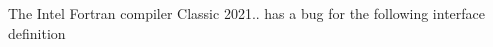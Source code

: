 
\begin{DoxyRefList}
\item[Type \mbox{\hyperlink{interfaceArrayReplace__mod_1_1replace}{Array\+Replace\+\_\+mod\+::replace}} ]\label{bug__bug000001}%
%
 The Intel Fortran compiler Classic 2021.. has a bug for the following interface definition 
\end{DoxyRefList}